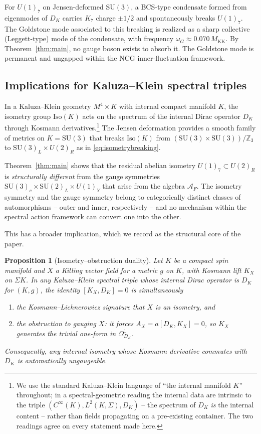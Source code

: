 \documentclass[12pt]{article}
\newtheorem{proposition}[theorem]{Proposition}
\theoremstyle{definition}
\theoremstyle{remark}
\newcommand{\Alg}{\mathcal{A}}
\newcommand{\KK}{M_{\mathrm{KK}}}
\begin{document}
For $U(1)_7$ on Jensen-deformed $\mathrm{SU}(3)$, a BCS-type condensate formed from eigenmodes of $D_K$ carries $K_7$ charge $\pm 1/2$ and spontaneously breaks $U(1)_7$.  The Goldstone mode associated to this breaking is realized as a sharp collective (Leggett-type) mode of the condensate, with frequency $\omega_G \approx 0.070\, \KK$.  By Theorem~\ref{thm:main}, no gauge boson exists to absorb it.  The Goldstone mode is permanent and ungapped within the NCG inner-fluctuation framework.

\subsection{Implications for Kaluza--Klein spectral triples}
\label{subsec:kkimplications}

In a Kaluza--Klein geometry $M^4 \times K$ with internal compact manifold $K$, the isometry group $\mathrm{Iso}(K)$ acts on the spectrum of the internal Dirac operator $D_K$ through Kosmann derivatives.\footnote{We use the standard Kaluza--Klein language of ``the internal manifold $K$'' throughout; in a spectral-geometric reading the internal data are intrinsic to the triple $(C^\infty(K), L^2(K,\Sigma), D_K)$ -- the spectrum of $D_K$ \emph{is} the internal content -- rather than fields propagating on a pre-existing container.  The two readings agree on every statement made here.}  The Jensen deformation provides a smooth family of metrics on $K = \mathrm{SU}(3)$ that breaks $\mathrm{Iso}(K)$ from $(\mathrm{SU}(3) \times \mathrm{SU}(3))/\mathbb{Z}_3$ to $\mathrm{SU}(3)_L \times U(2)_R$ as in \eqref{eq:isometrybreaking}.

Theorem~\ref{thm:main} shows that the residual abelian isometry $U(1)_7 \subset U(2)_R$ is \emph{structurally different} from the gauge symmetries $\mathrm{SU}(3)_c \times \mathrm{SU}(2)_L \times U(1)_Y$ that arise from the algebra $\Alg_F$.  The isometry symmetry and the gauge symmetry belong to categorically distinct classes of automorphisms -- outer and inner, respectively -- and no mechanism within the spectral action framework can convert one into the other.

This has a broader implication, which we record as the structural core of the paper.

\begin{proposition}[Isometry--obstruction duality]\label{prop:duality}
Let $K$ be a compact spin manifold and $X$ a Killing vector field for a metric $g$ on $K$, with Kosmann lift $K_X$ on $\Sigma K$.  In any Kaluza--Klein spectral triple whose internal Dirac operator is $D_K$ for $(K, g)$, the identity $[K_X, D_K] = 0$ is simultaneously
\begin{enumerate}
  \item the Kosmann--Lichnerowicz signature that $X$ is an isometry, and
  \item the obstruction to gauging $X$: it forces $A_X = a[D_K, K_X] = 0$, so $K_X$ generates the trivial one-form in $\Omega^1_{D_K}$.
\end{enumerate}
Consequently, any internal isometry whose Kosmann derivative commutes with $D_K$ is automatically ungaugeable.
\end{proposition}
\end{document}
